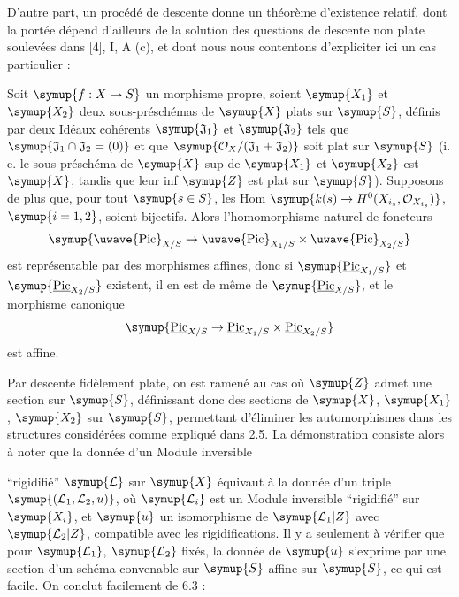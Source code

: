 D'autre part, un procédé de descente donne un théorème d'existence relatif,
dont la portée dépend d'ailleurs de la solution des questions de descente non
plate soulevées dans [4], I, A (c), et dont nous nous contentons d'expliciter
ici un cas particulier :

 Soit $\symup{f:X\to S}$ un morphisme propre,
soient $\symup{X_1}$ et $\symup{X_2}$ deux sous-préschémas de $\symup{X}$ plats sur $\symup{S}$, définis par
deux Idéaux cohérents $\symup{\mathfrak J_1}$ et $\symup{\mathfrak J_2}$ tels que
$\symup{\mathfrak J_1\cap\mathfrak J_2=(0)}$ et que
$\symup{\mathcal O_X/(\mathfrak J_1+\mathfrak J_2)}$ soit plat sur $\symup{S}$ (i. e. le
sous-préschéma de $\symup{X}$ sup de $\symup{X_1}$ et $\symup{X_2}$ est $\symup{X}$, tandis que leur inf $\symup{Z}$
est plat sur $\symup{S}$). Supposons de plus que, pour tout $\symup{s\in S}$, les Hom $\symup{k(s)\to H^0(X_{i_s},\mathcal O_{X_{i_s}})}$,
$\symup{i=1,2}$, soient bijectifs. Alors l'homomorphisme naturel de foncteurs
\[
\symup{\text{\uwave{Pic}}_{X/S}\to
\text{\uwave{Pic}}_{X_1/S}\times\text{\uwave{Pic}}_{X_2/S}}
\]
est représentable par des morphismes affines, donc si
$\symup{\underline{\operatorname{Pic}}_{X_1/S}}$ et $\symup{\underline{\operatorname{Pic}}_{X_2/S}}$ existent, il en
est de même de $\symup{\underline{\operatorname{Pic}}_{X/S}}$, et le morphisme canonique
\[
\symup{\underline{\operatorname{Pic}}_{X/S}\to
\underline{\operatorname{Pic}}_{X_1/S}\times\underline{\operatorname{Pic}}_{X_2/S}}
\]
est affine.

Par descente fidèlement plate, on est ramené au cas où $\symup{Z}$ admet une section
sur $\symup{S}$, définissant donc des sections de $\symup{X}$, $\symup{X_1}$, $\symup{X_2}$ sur $\symup{S}$,
permettant d'éliminer les automorphismes dans les structures considérées comme
expliqué dans 2.5. La démonstration consiste alors à noter que la donnée d'un
Module inversible

``rigidifié'' $\symup{\mathcal L}$ sur $\symup{X}$ équivaut à la donnée d'un triple
$\symup{(\mathcal L_1,\mathcal L_2,u)}$, où $\symup{\mathcal L_i}$ est un Module inversible
``rigidifié'' sur $\symup{X_i}$, et $\symup{u}$ un isomorphisme de
$\symup{\mathcal L_1|Z}$ avec $\symup{\mathcal L_2|Z}$, compatible avec les rigidifications.
Il y a seulement à vérifier que pour $\symup{\mathcal L_1}$, $\symup{\mathcal L_2}$ fixés, la
donnée de $\symup{u}$ s'exprime par une section d'un schéma convenable sur $\symup{S}$ affine
sur $\symup{S}$, ce qui est facile. On conclut facilement de 6.3 :

